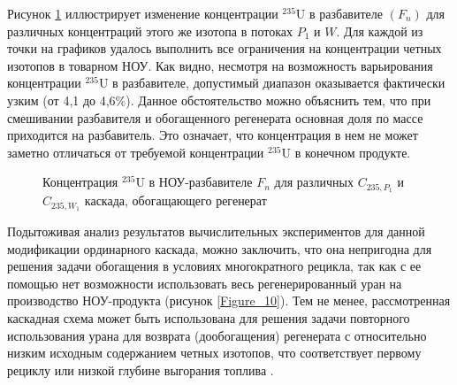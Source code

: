 


Рисунок \ref{fig3__7} иллюстрирует изменение концентрации $^{235}$U в разбавителе $(F_n)$ для различных концентраций этого же изотопа в потоках $P_1$ и $W$. Для каждой из точки на графиков удалось выполнить все ограничения на концентрации четных изотопов в товарном НОУ. Как видно, несмотря на возможность варьирования концентрации $^{235}$U в разбавителе, допустимый диапазон оказывается фактически узким (от 4,1 до 4,6\%). Данное обстоятельство можно объяснить тем, что при смешивании разбавителя и обогащенного регенерата основная доля по массе приходится на разбавитель. Это означает, что концентрация в нем не может заметно отличаться от требуемой концентрации $^{235}$U в конечном продукте.   

\begin{figure}[ht]
  \caption{Концентрация $^{235}$U в НОУ-разбавителе $F_n$ для различных $C_{235, P_1}$ и $C_{235, W_1}$ каскада, обогащающего регенерат}\label{fig3__7}
\end{figure}

Подытоживая анализ результатов вычислительных экспериментов для данной модификации ординарного каскада, можно заключить, что она непригодна для решения задачи обогащения в условиях многократного рецикла, так как с ее помощью нет возможности использовать весь регенерированный уран на производство НОУ-продукта (рисунок \ref{Figure_10}). Тем не менее, рассмотренная каскадная схема может быть использована для решения задачи повторного использования урана для возврата (дообогащения) регенерата с относительно низким исходным содержанием четных изотопов, что соответствует первому рециклу или низкой глубине выгорания топлива \cite{smirnovKaskadnyeShemyZadachah2012}.

